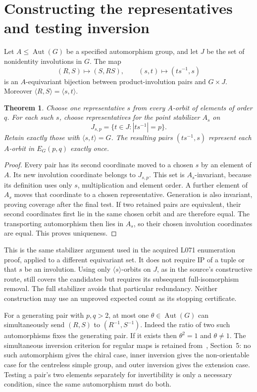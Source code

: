 \documentclass[11pt,a4paper]{article}
\newtheorem{theorem}{Theorem}
\newcommand{\Aut}{\operatorname{Aut}}
\newcommand{\gen}[1]{\langle#1\rangle}
\begin{document}
\section{Constructing the representatives and testing inversion}
Let $A\leq\Aut(G)$ be a specified automorphism group, and let $J$ be the
set of nonidentity involutions in $G$. The map
\[
 (R,S)\longmapsto(S,RS),\qquad (s,t)\longmapsto(ts^{-1},s)
\]
is an $A$-equivariant bijection between product-involution pairs and
$G\times J$. Moreover $\gen{R,S}=\gen{s,t}$.

\begin{theorem}\label{orbits}
Choose one representative $s$ from every $A$-orbit of elements of order
$q$. For each such $s$, choose representatives for the point stabilizer
$A_s$ on
\[
 J_{s,p}=\{t\in J:|ts^{-1}|=p\}.
\]
Retain exactly those with $\gen{s,t}=G$. The resulting pairs
$(ts^{-1},s)$ represent each $A$-orbit in $E_G(p,q)$ exactly once.
\end{theorem}
\begin{proof}
Every pair has its second coordinate moved to a chosen $s$ by an element
of $A$. Its new involution coordinate belongs to $J_{s,p}$. This set is
$A_s$-invariant, because its definition uses only $s$, multiplication and
element order. A further element of $A_s$ moves that coordinate to a chosen
representative. Generation is also invariant, proving coverage after the
final test. If two retained pairs are equivalent, their second coordinates
first lie in the same chosen orbit and are therefore equal. The transporting
automorphism then lies in $A_s$, so their chosen involution coordinates
are equal. This proves uniqueness.
\end{proof}

This is the same stabilizer argument used in the acquired L071 enumeration
proof, applied to a different equivariant set. It does not require IP of a
tuple or that $s$ be an involution. Using only $\gen s$-orbits on $J$, as
in the source's constructive route, still covers the candidates but requires
its subsequent full-isomorphism removal. The full stabilizer avoids that
particular redundancy. Neither construction may use an unproved expected
count as its stopping certificate.

For a generating pair with $p,q>2$, at most one $\theta\in\Aut(G)$
can simultaneously send $(R,S)$ to $(R^{-1},S^{-1})$. Indeed the ratio of
two such automorphisms fixes the generating pair. If it exists then
$\theta^2=1$ and $\theta\ne1$. The simultaneous inversion criterion
for regular maps is retained from~\cite{CL}, Section~5: no such
automorphism gives the chiral case, inner inversion gives the non-orientable
case for the centreless simple group, and outer inversion gives the
extension case. Testing a pair's two elements separately for invertibility
is only a necessary condition, since the same automorphism must do both.
\end{document}
